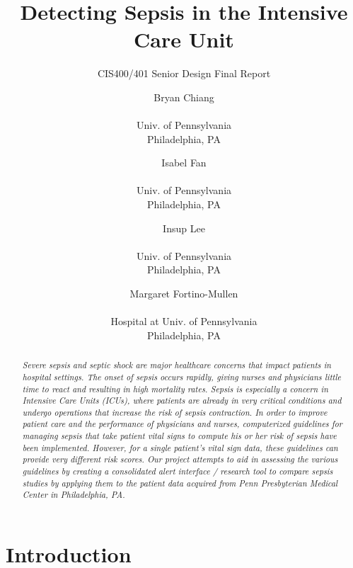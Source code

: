 \documentclass{sig-alternate}
\begin{document}
 

\title{Detecting Sepsis in the Intensive Care Unit}
\subtitle{CIS400/401 Senior Design Final Report}
\author{
Bryan Chiang \\  \\ Univ. of Pennsylvania \\ Philadelphia, PA
\and Isabel Fan \\  \\ Univ. of Pennsylvania \\ Philadelphia, PA   
\and Insup Lee \\  \\ Univ. of Pennsylvania \\ Philadelphia, PA
\and Margaret Fortino-Mullen \\  \\ Hospital at Univ. of Pennsylvania \\ Philadelphia, PA}
\date{}
\maketitle


\begin{abstract}
\vspace{10pt}
\textit{Severe sepsis and septic shock are major healthcare concerns that impact patients in hospital settings. The onset of sepsis occurs rapidly, giving nurses and physicians little time to react and resulting in high mortality rates. Sepsis is especially a concern in Intensive Care Units (ICUs), where patients are already in very critical conditions and undergo operations that increase the risk of sepsis contraction. In order to improve patient care and the performance of physicians and nurses, computerized guidelines for managing sepsis that take patient vital signs to compute his or her risk of sepsis have been implemented. However, for a single patient's vital sign data, these guidelines can provide very different risk scores. Our project attempts to aid in assessing the various guidelines by creating a consolidated alert interface / research tool to compare sepsis studies by applying them to the patient data acquired from Penn Presbyterian Medical Center in Philadelphia, PA. } 
\end{abstract}

\vspace{10pt}
\section{Introduction}
\vspace{10pt}
\label{sec:intro}
\end{document}
